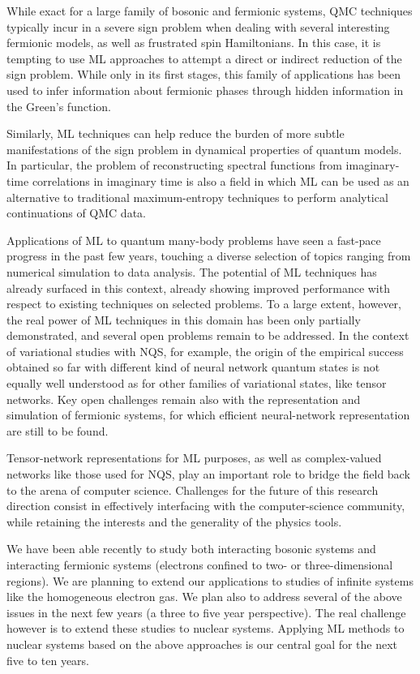 \documentclass[aip,jcp,reprint,floatfix]{revtex4-1}
\begin{document}
While exact for a large family of bosonic and fermionic systems, QMC techniques
typically incur in a severe sign problem when dealing with several
interesting fermionic models, as well as frustrated spin Hamiltonians.
In this case, it is tempting to use ML approaches to attempt a direct
or indirect reduction of the sign problem. While only in its first
stages, this family of applications has been used to infer information
about fermionic phases through hidden information in the Green's function.

Similarly, ML techniques can help reduce the burden of more subtle
manifestations of the sign problem in dynamical properties of quantum
models. In particular, the problem of reconstructing spectral functions
from imaginary-time correlations in imaginary time is also a field
in which ML can be used as an alternative to traditional maximum-entropy
techniques to perform analytical continuations of QMC data.

Applications of ML to quantum many-body problems have seen a fast-pace
progress in the past few years, touching a diverse selection of topics
ranging from numerical simulation to data analysis. The potential of
ML techniques has already surfaced in this context, already showing
improved performance with respect to existing techniques on selected
problems. To a large extent, however, the real power of ML techniques
in this domain has been only partially demonstrated, and several open
problems remain to be addressed.
In the context of variational studies with NQS, for example, the
origin of the empirical success obtained so far with different kind of
neural network quantum states is not equally well understood as for
other families of variational states, like tensor networks. Key open
challenges remain also with the representation and simulation of
fermionic systems, for which efficient neural-network representation
are still to be found.


Tensor-network representations for ML purposes, as well as
complex-valued networks like those used for NQS, play an important
role to bridge the field back to the arena of computer
science. Challenges for the future of this research direction consist
in effectively interfacing with the computer-science community, while
retaining the interests and the generality of the physics tools.


We have been able recently to study both interacting bosonic systems
and interacting fermionic systems (electrons confined to two- or
three-dimensional regions). We are planning to extend our applications to studies of infinite systems
like the homogeneous electron gas.  We plan also to address several of the
above issues in the next few years (a three to five year perspective).
The real challenge however is to extend these studies to nuclear
systems. Applying ML methods to nuclear systems based on the above
approaches is our central goal for the next five to ten years.
\end{document}
